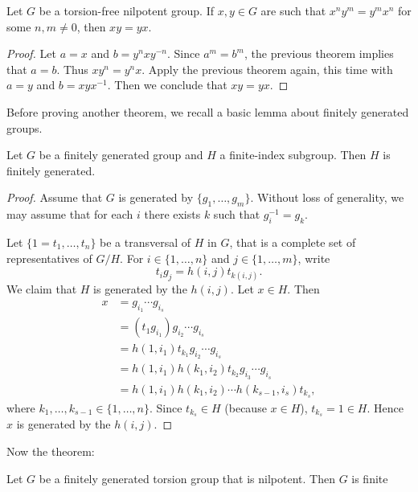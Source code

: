 \begin{corollary}
Let $G$ be a torsion-free nilpotent group. If $x,y\in G$ are such that 
$x^ny^m=y^mx^n$ for some $n,m\ne 0$, then $xy=yx$.
\end{corollary}

\begin{proof}
Let $a=x$ and $b=y^nxy^{-n}$. Since $a^m=b^m$, the previous theorem implies that 
$a=b$. Thus $xy^n=y^nx$. Apply the previous theorem again, this time with 
$a=y$ and $b=xyx^{-1}$. Then we conclude that 
$xy=yx$. 
\end{proof}

Before proving another theorem, we recall a basic 
lemma about finitely generated groups. 

\begin{lemma}
\label{lem:fg}
Let $G$ be a finitely generated group and 
$H$ a finite-index subgroup. 
Then $H$ is finitely generated. 
\end{lemma}

\begin{proof}
Assume that $G$ is generated by $\{g_1,\dots,g_m\}$. Without loss of generality, we may assume that 
for each $i$ there exists $k$ such that $g_i^{-1}=g_k$. 
	
Let $\{1=t_1,\dots,t_n\}$ be a transversal of $H$ in $G$, that is 
a complete set of representatives of $G/H$. For $i\in\{1,\dots,n\}$ 
and $j\in\{1,\dots,m\}$, write 
\[
t_ig_j=h(i,j)t_{k(i,j)}.
\]
We claim that $H$ is generated by the $h(i,j)$. Let $x\in H$. Then  
	\begin{align*}
	x &=g_{i_1}\cdots g_{i_s}\\
	&= (t_1g_{i_1})g_{i_2}\cdots g_{i_s}\\
	&= h(1,i_1)t_{k_1}g_{i_2}\cdots g_{i_s}\\
	&= h(1,i_1)h(k_1,i_2)t_{k_2}g_{i_3}\cdots g_{i_s}\\
	&= h(1,i_1)h(k_1,i_2)\cdots h(k_{s-1},i_s)t_{k_s},
	\end{align*}
where $k_1,\dots,k_{s-1}\in\{1,\dots,n\}$. Since $t_{k_s}\in H$ (because $x\in H$), 
$t_{k_s}=1\in H$. Hence  $x$ is generated by the $h(i,j)$.
\end{proof}

Now the theorem:

\begin{theorem}
\label{thm:T(G)finito}
Let $G$ be a finitely generated torsion group that is nilpotent. 
Then $G$ is finite 
\end{theorem}

